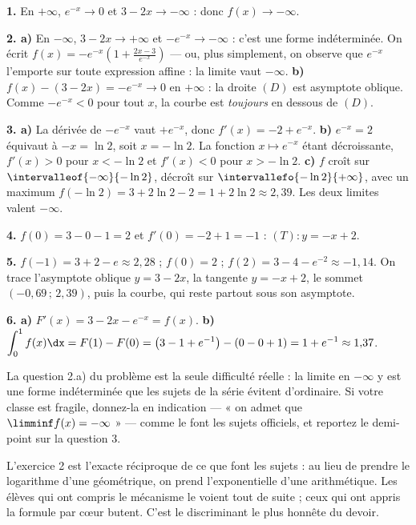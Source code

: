 \begin{corrige}
\textbf{1.} En $+\infty$, $e^{-x} \to 0$ et $3-2x \to -\infty$ : donc
$f(x) \to -\infty$.

\textbf{2. a)} En $-\infty$, $3-2x \to +\infty$ et $-e^{-x} \to -\infty$ :
c'est une forme indéterminée. On écrit
$f(x) = -e^{-x}\left(1+\frac{2x-3}{e^{-x}}\right)$ — ou, plus simplement, on
observe que $e^{-x}$ l'emporte sur toute expression affine : la limite vaut
$-\infty$.
\textbf{b)} $f(x)-(3-2x) = -e^{-x} \to 0$ en $+\infty$ : la droite $(D)$ est
asymptote oblique. Comme $-e^{-x}<0$ pour tout $x$, la courbe est
\emph{toujours} en dessous de $(D)$.

\textbf{3. a)} La dérivée de $-e^{-x}$ vaut $+e^{-x}$, donc
$f'(x) = -2+e^{-x}$.
\textbf{b)} $e^{-x} = 2$ équivaut à $-x = \ln2$, soit $x = -\ln2$. La
fonction $x \mapsto e^{-x}$ étant décroissante, $f'(x)>0$ pour
$x<-\ln2$ et $f'(x)<0$ pour $x>-\ln2$.
\textbf{c)} $f$ croît sur $\intervalleof{-\infty}{-\ln2}$, décroît sur
$\intervallefo{-\ln2}{+\infty}$, avec un maximum
$f(-\ln2) = 3+2\ln2-2 = 1+2\ln2 \approx 2{,}39$. Les deux limites valent
$-\infty$.

\textbf{4.} $f(0) = 3-0-1 = 2$ et $f'(0) = -2+1 = -1$ : $(T) : y = -x+2$.

\textbf{5.} $f(-1) = 3+2-e \approx 2{,}28$ ; $f(0) = 2$ ;
$f(2) = 3-4-e^{-2} \approx -1{,}14$. On trace l'asymptote oblique
$y = 3-2x$, la tangente $y = -x+2$, le sommet
$\left(-0{,}69\,;\,2{,}39\right)$, puis la courbe, qui reste partout sous
son asymptote.

\textbf{6. a)} $F'(x) = 3-2x-e^{-x} = f(x)$. \checkmark
\textbf{b)} $\displaystyle\int_{0}^{1} f(x)\dx = F(1)-F(0)
= \left(3-1+e^{-1}\right)-\left(0-0+1\right) = 1+e^{-1} \approx 1{,}37$.
\end{corrige}

\begin{notepourlaclasse}
La question 2.a) du problème est la seule difficulté réelle : la limite en
$-\infty$ y est une forme indéterminée que les sujets de la série évitent
d'ordinaire. Si votre classe est fragile, donnez-la en indication — « on
admet que $\limminf f(x) = -\infty$ » — comme le font les sujets officiels,
et reportez le demi-point sur la question 3.

L'exercice 2 est l'exacte réciproque de ce que font les sujets : au lieu de
prendre le logarithme d'une géométrique, on prend l'exponentielle d'une
arithmétique. Les élèves qui ont compris le mécanisme le voient tout de
suite ; ceux qui ont appris la formule par c\oe ur butent. C'est le
discriminant le plus honnête du devoir.
\end{notepourlaclasse}
